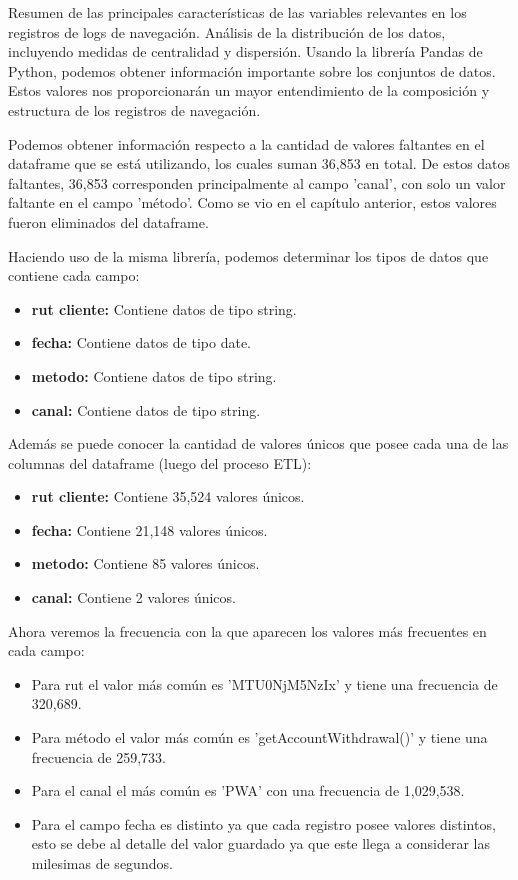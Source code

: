 Resumen de las principales características de las variables relevantes en los registros de logs de navegación. Análisis de la distribución de los datos, incluyendo medidas de centralidad y dispersión. Usando la librería Pandas de Python, podemos obtener información importante sobre los conjuntos de datos. Estos valores nos proporcionarán un mayor entendimiento de la composición y estructura de los registros de navegación.

Podemos obtener información respecto a la cantidad de valores faltantes en el dataframe que se está utilizando, los cuales suman 36,853 en total. De estos datos faltantes, 36,853 corresponden principalmente al campo 'canal', con solo un valor faltante en el campo 'método'. Como se vio en el capítulo anterior, estos valores fueron eliminados del dataframe.

Haciendo uso de la misma librería, podemos determinar los tipos de datos que contiene cada campo:

\begin{itemize}
    \item \textbf{rut cliente:} Contiene datos de tipo string.
    \item \textbf{fecha:} Contiene datos de tipo date.
    \item \textbf{metodo:} Contiene datos de tipo string.
    \item \textbf{canal:} Contiene datos de tipo string.
\end{itemize}

Además se puede conocer la cantidad de valores únicos que posee cada una de las columnas del dataframe (luego del proceso ETL):

\begin{itemize}
    \item \textbf{rut cliente:} Contiene 35,524 valores únicos.
    \item \textbf{fecha:} Contiene 21,148 valores únicos.
    \item \textbf{metodo:} Contiene 85 valores únicos.
    \item \textbf{canal:} Contiene 2 valores únicos.
\end{itemize}

Ahora veremos la frecuencia con la que aparecen los valores más frecuentes en cada campo:
\begin{itemize}
    \item Para rut el valor más común es 'MTU0NjM5NzIx' y tiene una frecuencia de 320,689.
    \item Para método el valor más común es 'getAccountWithdrawal()' y tiene una frecuencia de 259,733.
    \item Para el canal el más común es 'PWA' con una frecuencia de 1,029,538.
    \item Para el campo fecha es distinto ya que cada registro posee valores distintos, esto se debe al detalle del valor guardado ya que este llega a considerar las milesimas de segundos.
\end{itemize}

